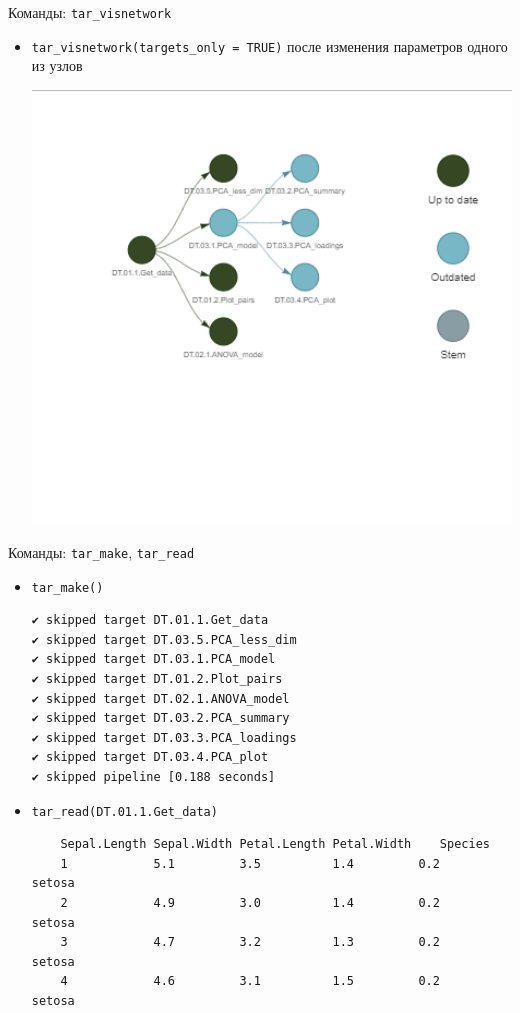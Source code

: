 \documentclass[
  ignorenonframetext,
]{beamer}
\begin{document}
\begin{frame}[fragile]{Команды: \texttt{tar\_visnetwork}}
\label{ux43aux43eux43cux430ux43dux434ux44b-tar_visnetwork-1}
\begin{itemize}
\item
  \texttt{tar\_visnetwork(targets\_only\ =\ TRUE)} после изменения
  параметров одного из узлов

  \includegraphics[width=5.20833in,height=\textheight]{Sources/outdated_target.png}
\end{itemize}
\end{frame}

\begin{frame}[fragile]{Команды: \texttt{tar\_make}, \texttt{tar\_read}}
\label{ux43aux43eux43cux430ux43dux434ux44b-tar_make-tar_read}
\begin{itemize}
\item
  \texttt{tar\_make()}

\begin{verbatim}
✔ skipped target DT.01.1.Get_data
✔ skipped target DT.03.5.PCA_less_dim 
✔ skipped target DT.03.1.PCA_model 
✔ skipped target DT.01.2.Plot_pairs 
✔ skipped target DT.02.1.ANOVA_model
✔ skipped target DT.03.2.PCA_summary
✔ skipped target DT.03.3.PCA_loadings
✔ skipped target DT.03.4.PCA_plot
✔ skipped pipeline [0.188 seconds]
\end{verbatim}
\item
  \texttt{tar\_read(DT.01.1.Get\_data)}

\begin{verbatim}
    Sepal.Length Sepal.Width Petal.Length Petal.Width    Species 
    1            5.1         3.5          1.4         0.2     setosa
    2            4.9         3.0          1.4         0.2     setosa
    3            4.7         3.2          1.3         0.2     setosa
    4            4.6         3.1          1.5         0.2     setosa
\end{verbatim}
\end{itemize}
\end{frame}
\end{document}
